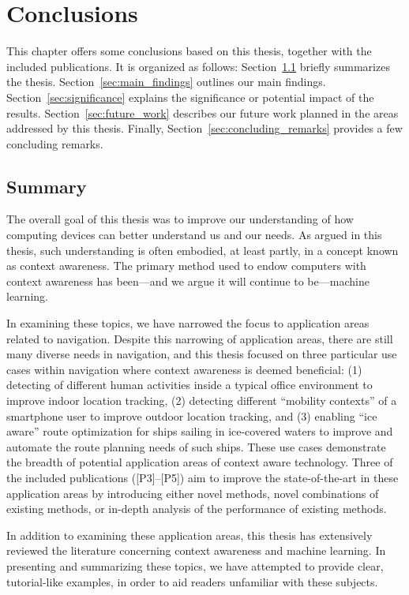 \chapter{Conclusions}
\label{ch:conclusions}

This chapter offers some conclusions based on this thesis, together with the included publications. It is organized as follows: Section~\ref{sec:summary} briefly summarizes the thesis. Section~\ref{sec:main_findings} outlines our main findings. Section~\ref{sec:significance} explains the significance or potential impact of the results. Section~\ref{sec:future_work} describes our future work planned in the areas addressed by this thesis. Finally, Section~\ref{sec:concluding_remarks} provides a few concluding remarks.

\section{Summary}
\label{sec:summary}

The overall goal of this thesis was to improve our understanding of how computing devices can better understand us and our needs. As argued in this thesis, such understanding is often embodied, at least partly, in a concept known as context awareness. The primary method used to endow computers with context awareness has been---and we argue it will continue to be---machine learning. 

In examining these topics, we have narrowed the focus to application areas related to navigation. Despite this narrowing of application areas, there are still many diverse needs in navigation, and this thesis focused on three particular use cases within navigation where context awareness is deemed beneficial: (1) detecting of different human activities inside a typical office environment to improve indoor location tracking, (2) detecting different ``mobility contexts'' of a smartphone user to improve outdoor location tracking, and (3) enabling ``ice aware'' route optimization for ships sailing in ice-covered waters to improve and automate the route planning needs of such ships. These use cases demonstrate the breadth of potential application areas of context aware technology. Three of the included publications ([P3]--[P5]) aim to improve the state-of-the-art in these application areas by introducing either novel methods, novel combinations of existing methods, or in-depth analysis of the performance of existing methods.

In addition to examining these application areas, this thesis has extensively reviewed the literature concerning context awareness and machine learning. In presenting and summarizing these topics, we have attempted to provide clear, tutorial-like examples, in order to aid readers unfamiliar with these subjects.

